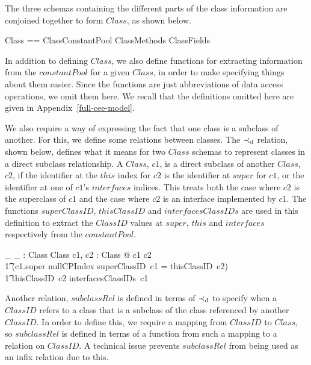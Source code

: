 The three schemas containing the different parts of the class
information are conjoined together to form $Class$, as shown below.
\begin{zed}
  Class == ClassConstantPool \land ClassMethods \land ClassFields
\end{zed}

In addition to defining $Class$, we also define functions for
extracting information from the $constantPool$ for a given $Class$, in
order to make specifying things about them easier.
Since the functions are just abbreviations of data access operations,
we omit them here.
We recall that the definitions omitted here are given in
Appendix~\ref{full-cee-model}.

We also require a way of expressing the fact that one class is a
subclass of another.
For this, we define some relations between classes.
The $\prec_{\mathrm{d}}$ relation, shown below, defines what it means for
two $Class$ schemas to represent classes in a direct subclass
relationship.
A $Class$, $c1$, is a direct subclass of another $Class$, $c2$, if the
identifier at the $this$ index for $c2$ is the identifier at $super$
for $c1$, or the identifier at one of $c1$'s $interfaces$ indices.
This treats both the case where $c2$ is the superclass of $c1$ and the
case where $c2$ is an interface implemented by $c1$.
The functions $superClassID$, $thisClassID$ and $interfacesClassIDs$
are used in this definition to extract the $ClassID$ values at
$super$, $this$ and $interfaces$ respectively from the $constantPool$.
\begin{axdef}
  \_ \directsubclass \_ : Class \rel Class
  \where
  \forall c1, c2 : Class @ c1 \directsubclass c2 \iff {} \\
  \t1 (c1.super \neq nullCPIndex \land superClassID~c1 = thisClassID~c2) \\
  \t1 {} \lor thisClassID~c2 \in interfacesClassIDs~c1
\end{axdef}
Another relation, $subclassRel$ is defined in terms of
$\prec_{\mathrm{d}}$ to specify when a $ClassID$ refers to a class that
is a subclass of the class referenced by another $ClassID$.
In order to define this, we require a mapping from $ClassID$ to
$Class$, so $subclassRel$ is defined in terms of a function from such
a mapping to a relation on $ClassID$.
A technical issue prevents $subclassRel$ from being used as an infix
relation due to this.


